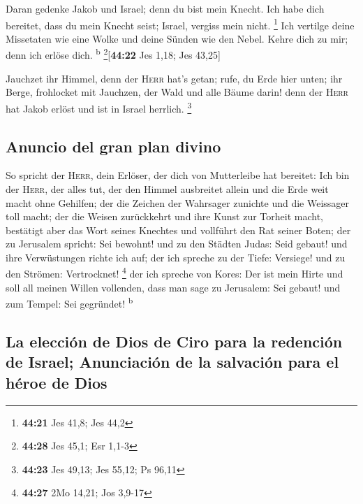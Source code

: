  Daran gedenke Jakob und Israel; denn du bist mein
Knecht. Ich habe dich bereitet, dass du mein Knecht seist; Israel,
vergiss mein nicht. \footnote{\textbf{44:21} Jes 41,8; Jes 44,2}
 Ich vertilge deine Missetaten wie eine Wolke und deine
Sünden wie den Nebel. Kehre dich zu mir; denn ich erlöse dich.
\textsuperscript{b} \footnote{\textbf{44:28} Jes 45,1; Esr 1,1-3}{[}\textbf{44:22}
Jes 1,18; Jes 43,25{]}

 Jauchzet ihr Himmel, denn der \textsc{Herr} hat's getan;
rufe, du Erde hier unten; ihr Berge, frohlocket mit Jauchzen, der Wald
und alle Bäume darin! denn der \textsc{Herr} hat Jakob erlöst und ist in
Israel herrlich. \footnote{\textbf{44:23} Jes 49,13; Jes 55,12; Ps 96,11}

\hypertarget{anuncio-del-gran-plan-divino}{%
\subsection{Anuncio del gran plan
divino}\label{anuncio-del-gran-plan-divino}}

 So spricht der \textsc{Herr}, dein Erlöser, der dich von
Mutterleibe hat bereitet: Ich bin der \textsc{Herr}, der alles tut, der
den Himmel ausbreitet allein und die Erde weit macht ohne Gehilfen;
 der die Zeichen der Wahrsager zunichte und die Weissager
toll macht; der die Weisen zurückkehrt und ihre Kunst zur Torheit macht,
 bestätigt aber das Wort seines Knechtes und vollführt
den Rat seiner Boten; der zu Jerusalem spricht: Sei bewohnt! und zu den
Städten Judas: Seid gebaut! und ihre Verwüstungen richte ich auf;
 der ich spreche zu der Tiefe: Versiege! und zu den
Strömen: Vertrocknet! \footnote{\textbf{44:27} 2Mo 14,21; Jos 3,9-17}
 der ich spreche von Kores: Der ist mein Hirte und soll
all meinen Willen vollenden, dass man sage zu Jerusalem: Sei gebaut! und
zum Tempel: Sei gegründet! \textsuperscript{b}

\hypertarget{la-elecciuxf3n-de-dios-de-ciro-para-la-redenciuxf3n-de-israel-anunciaciuxf3n-de-la-salvaciuxf3n-para-el-huxe9roe-de-dios}{%
\subsection{La elección de Dios de Ciro para la redención de Israel;
Anunciación de la salvación para el héroe de
Dios}\label{la-elecciuxf3n-de-dios-de-ciro-para-la-redenciuxf3n-de-israel-anunciaciuxf3n-de-la-salvaciuxf3n-para-el-huxe9roe-de-dios}}

